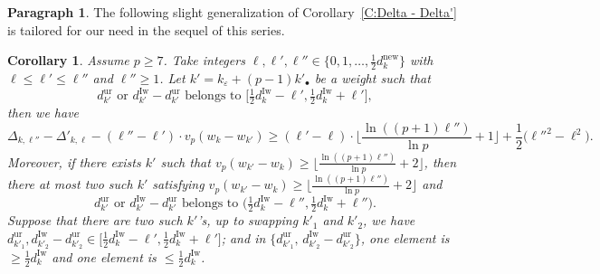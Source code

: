 \documentclass[12pt]{amsart}
\newtheorem{corollary}[subsection]{Corollary}
\theoremstyle{definition}
\newtheorem{para}[subsection]{Paragraph}
\numberwithin{equation}{subsection}
\newcommand{\new}{\mathrm{new}}
\newcommand{\Iw}{\mathrm{Iw}}
\newcommand{\ur}{\mathrm{ur}}
\begin{document}
\begin{para}
\label{P:para_158}
The following slight generalization of Corollary~\ref{C:Delta - Delta'} is tailored for our need in the sequel of this series.
\end{para}
\begin{corollary}
\label{C:Delta - Delta' multi}
Assume $p \geq 7$. Take integers $\ell, \ell', \ell'' \in \{0,1, \dots, \frac 12d_k^\new\}$ with $\ell \leq \ell'\leq  \ell''$ and $\ell''\geq 1$.
Let $k' = k_\varepsilon + (p-1)k'_{\bullet}$ be a weight such that
$$
d_{k'}^\ur \textrm{ or } d_{k'}^\Iw - d_{k'}^\ur \textrm{ belongs to } \big[\tfrac 12d_k^\Iw-\ell', \tfrac 12 d_k^\Iw+\ell'\big],
$$
then we have
\begin{equation}
\label{E:Delta l'' -Delta l}
\Delta_{k, \ell''}- \Delta'_{k, \ell} - (\ell''-\ell') \cdot  v_p(w_k - w_{k'}) \geq (\ell'-\ell) \cdot \Big\lfloor \frac{\ln((p+1)\ell'')}{\ln p}+1\Big\rfloor + \frac 12\big( \ell''^2 - \ell^2\big).
\end{equation}
Moreover, if there exists $k'$ such that $v_p(w_{k'}-w_k) \geq \big\lfloor \frac{\ln((p+1)\ell'')}{\ln p}+2\big\rfloor $, then there at most two such $k'$ satisfying $v_p(w_{k'}-w_k) \geq \big\lfloor \frac{\ln((p+1)\ell'')}{\ln p}+2\big\rfloor $ and
$$
d_{k'}^\ur \textrm{ or } d_{k'}^\Iw - d_{k'}^\ur \textrm{ belongs to } \big(\tfrac 12d_k^\Iw-\ell'', \tfrac 12 d_k^\Iw+\ell''\big).
$$ 
Suppose that there are two such $k'$'s, up to swapping $k'_1$ and $k'_2$, we have $d_{k'_1}^\ur, d_{k'_2}^\Iw-d_{k'_2}^\ur \in \big[\frac 12d_k^\Iw-\ell', \frac 12d_k^\Iw+\ell'\big]$; and in $\{d_{k'_1}^\ur,\, d_{k'_2}^\Iw-d_{k'_2}^\ur\}$, one element is $ \geq \frac 12 d_k^\Iw$ and one element is $ \leq \frac 12 d_k^\Iw$.
\end{corollary}
\end{document}
